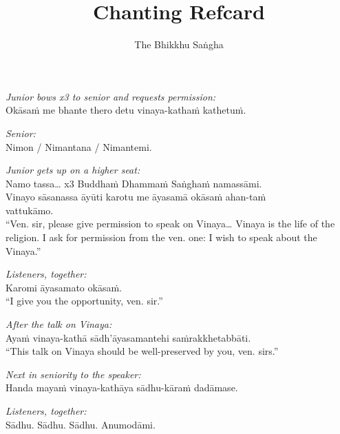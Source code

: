 \documentclass[10pt,oneside]{memoir}
\title{Chanting Refcard}
\author{The Bhikkhu Saṅgha}
\begin{document}
\begin{hangparas}{1em}{1}

\emph{Junior bows x3 to senior and requests permission:}\\
Okāsaṁ me bhante thero detu vinaya-kathaṁ kathetuṁ.

\emph{Senior:}\\
Nimon / Nimantana / Nimantemi.

\emph{Junior gets up on a higher seat:}\\
Namo tassa\ldots{} x3 Buddhaṁ Dhammaṁ Saṅghaṁ namassāmi.\\
Vinayo sāsanassa āyūti karotu me āyasamā okāsaṁ ahan-taṁ\\ vattukāmo.\\[5pt]
``Ven. sir, please give permission to speak on Vinaya\ldots{} Vinaya is the
life of the religion. I ask for permission from the ven. one: I wish
to speak about the Vinaya.''

\emph{Listeners, together:}\\
Karomi āyasamato okāsaṁ.\\[5pt]
``I give you the opportunity, ven. sir.''

\emph{After the talk on Vinaya:}\\
Ayaṁ vinaya-kathā sādh'āyasamantehi saṁrakkhetabbāti.\\[5pt]
``This talk on Vinaya should be well-preserved by you, ven. sirs.''

\emph{Next in seniority to the speaker:}\\
Handa mayaṁ vinaya-kathāya sādhu-kāraṁ dadāmase.

\emph{Listeners, together:}\\
Sādhu. Sādhu. Sādhu. Anumodāmi.

\end{hangparas}
\end{document}
